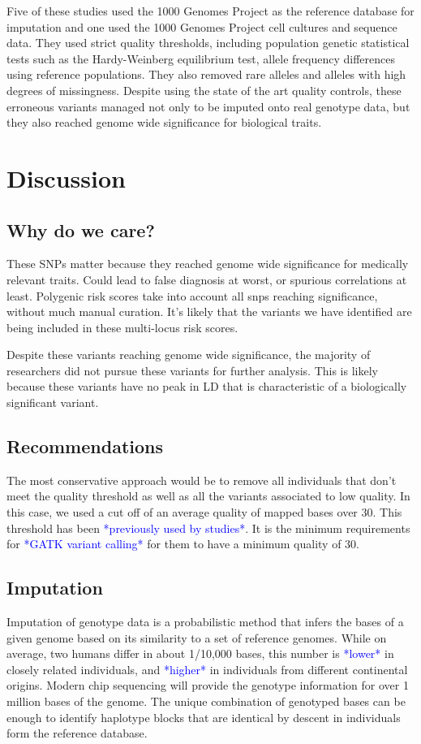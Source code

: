 \documentclass[9pt,lineno]{elife}
\newcommand{\todo}[1]{\textcolor{blue}{*#1*}}
\begin{document}
Five of these studies used the 1000 Genomes Project as the reference database for imputation and one used the 1000 Genomes Project cell cultures and sequence data. 
They used strict quality thresholds, including population genetic statistical tests such as the Hardy-Weinberg equilibrium test, allele frequency differences using reference populations. 
They also removed rare alleles and alleles with high degrees of missingness. 
Despite using the state of the art quality controls, these erroneous variants managed not only to be imputed onto real genotype data, but they also reached genome wide significance for biological traits. 

			\section{Discussion}
\subsection{Why do we care?}
These SNPs matter because they reached genome wide significance for medically relevant traits. 
Could lead to false diagnosis at worst, or spurious correlations at least. 
Polygenic risk scores take into account all snps reaching significance, without much manual curation. 
It's likely that the variants we have identified are being included in these multi-locus risk scores.


Despite these variants reaching genome wide significance, the majority of researchers did not pursue these variants for further analysis.
This is likely because these variants have no peak in LD that is characteristic of a biologically significant variant.

\subsection{Recommendations}
The most conservative approach would be to remove all individuals that don't meet the quality threshold as well as all the variants associated to low quality.
In this case, we used a cut off of an average quality of mapped bases over 30. This threshold has been \todo{previously used by studies}. It is the minimum requirements for \todo{GATK variant calling} for them to have a minimum quality of 30.

\subsection{Imputation}
Imputation of genotype data is a probabilistic method that infers the bases of a given genome based on its similarity to a set of reference genomes.
While on average, two humans differ in about 1/10,000 bases, this number is \todo{lower} in closely related individuals, and \todo{higher} in individuals from different continental origins.
Modern chip sequencing will provide the genotype information for over 1 million bases of the genome.
The unique combination of genotyped bases can be enough to identify haplotype blocks that are identical by descent in individuals form the reference database.
\end{document}
